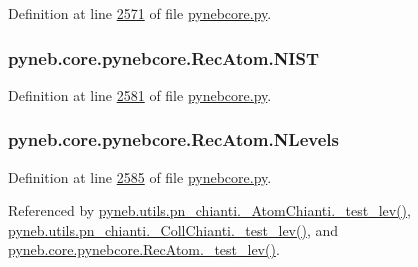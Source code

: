 Definition at line \hyperlink{pynebcore_8py_source_l02571}{2571} of file \hyperlink{pynebcore_8py_source}{pynebcore.\+py}.

\hypertarget{classpyneb_1_1core_1_1pynebcore_1_1_rec_atom_afe5a91d97ffefced34fb2f2c271736ec}{}
\subsubsection[{N\+I\+S\+T}]{\setlength{\rightskip}{0pt plus 5cm}pyneb.\+core.\+pynebcore.\+Rec\+Atom.\+N\+I\+S\+T}\label{classpyneb_1_1core_1_1pynebcore_1_1_rec_atom_afe5a91d97ffefced34fb2f2c271736ec}


Definition at line \hyperlink{pynebcore_8py_source_l02581}{2581} of file \hyperlink{pynebcore_8py_source}{pynebcore.\+py}.

\hypertarget{classpyneb_1_1core_1_1pynebcore_1_1_rec_atom_a37c93c0fbaad583a1019f5930bc51999}{}
\subsubsection[{N\+Levels}]{\setlength{\rightskip}{0pt plus 5cm}pyneb.\+core.\+pynebcore.\+Rec\+Atom.\+N\+Levels}\label{classpyneb_1_1core_1_1pynebcore_1_1_rec_atom_a37c93c0fbaad583a1019f5930bc51999}


Definition at line \hyperlink{pynebcore_8py_source_l02585}{2585} of file \hyperlink{pynebcore_8py_source}{pynebcore.\+py}.



Referenced by \hyperlink{pn__chianti_8py_source_l00284}{pyneb.\+utils.\+pn\+\_\+chianti.\+\_\+\+Atom\+Chianti.\+\_\+test\+\_\+lev()}, \hyperlink{pn__chianti_8py_source_l00449}{pyneb.\+utils.\+pn\+\_\+chianti.\+\_\+\+Coll\+Chianti.\+\_\+test\+\_\+lev()}, and \hyperlink{pynebcore_8py_source_l02596}{pyneb.\+core.\+pynebcore.\+Rec\+Atom.\+\_\+test\+\_\+lev()}.

\hypertarget{classpyneb_1_1core_1_1pynebcore_1_1_rec_atom_a2108a27da329b8599357e990a446faae}{}
